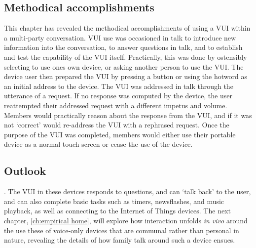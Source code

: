 \subsection{Methodical accomplishments}\label{sec:empirical cafe summary methods}
\begin{revisedsubmission}
This chapter has revealed the methodical accomplishments of using a \ac{VUI} within a multi-party conversation.
\ac{VUI} use was occasioned in talk to introduce new information into the conversation, to answer questions in talk, and to establish and test the capability of the \ac{VUI} itself.
Practically, this was done by ostensibly selecting to use ones own device, or asking another person to use the \ac{VUI}.
The device user then prepared the \ac{VUI} by pressing a button or using the hotword as an initial address to the device.
The \ac{VUI} was addressed in talk through the utterance of a request. If no response was computed by the device, the user reattempted their addressed request with a different impetus and volume.
Members would practically reason about the response from the \ac{VUI}, and if it was not `correct' would re-address the \ac{VUI} with a rephrased request.
Once the purpose of the \ac{VUI} was completed, members would either use their portable device as a normal touch screen or cease the use of the device.
\end{revisedsubmission}






\subsection{Outlook}\label{sec:empirical cafe summary outlook}
.
The \ac{VUI} in these devices responds to questions, and can `talk back' to the user, and can also complete basic tasks such as timers, newsflashes, and music playback, as well as connecting to the Internet of Things devices.
The next chapter, \autoref{ch:empirical home}, will explore how interaction unfolds \textit{in vivo} around the use these of voice-only devices that are communal rather than personal in nature, revealing the details of how family talk around such a device ensues.



